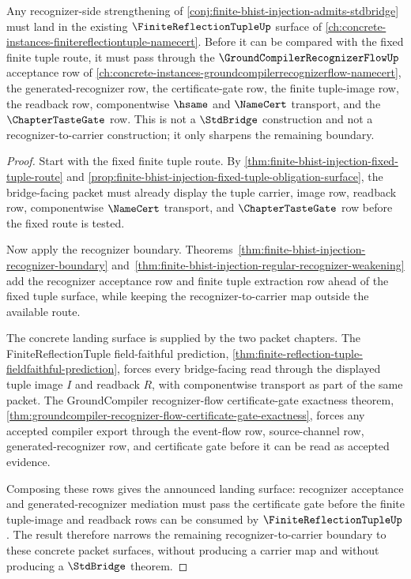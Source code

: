\begin{theorem}
\label{thm:finite-bhist-injection-recognizer-to-tuple-landing-surface}
Any recognizer-side strengthening of \autoref{conj:finite-bhist-injection-admits-stdbridge} must land in the existing $\FiniteReflectionTupleUp$ surface of \autoref{ch:concrete-instances-finitereflectiontuple-namecert}. Before it can be compared with the fixed finite tuple route, it must pass through the $\GroundCompilerRecognizerFlowUp$ acceptance row of \autoref{ch:concrete-instances-groundcompilerrecognizerflow-namecert}, the generated-recognizer row, the certificate-gate row, the finite tuple-image row, the readback row, componentwise $\hsame$ and $\NameCert$ transport, and the $\ChapterTasteGate$ row. This is not a $\StdBridge$ construction and not a recognizer-to-carrier construction; it only sharpens the remaining boundary.
\end{theorem}
\begin{proof}
Start with the fixed finite tuple route. By \autoref{thm:finite-bhist-injection-fixed-tuple-route} and \autoref{prop:finite-bhist-injection-fixed-tuple-obligation-surface}, the bridge-facing packet must already display the tuple carrier, image row, readback row, componentwise $\NameCert$ transport, and $\ChapterTasteGate$ row before the fixed route is tested.

Now apply the recognizer boundary. Theorems~\ref{thm:finite-bhist-injection-recognizer-boundary} and~\ref{thm:finite-bhist-injection-regular-recognizer-weakening} add the recognizer acceptance row and finite tuple extraction row ahead of the fixed tuple surface, while keeping the recognizer-to-carrier map outside the available route.

The concrete landing surface is supplied by the two packet chapters. The FiniteReflectionTuple field-faithful prediction, \autoref{thm:finite-reflection-tuple-fieldfaithful-prediction}, forces every bridge-facing read through the displayed tuple image $I$ and readback $R$, with componentwise transport as part of the same packet. The GroundCompiler recognizer-flow certificate-gate exactness theorem, \autoref{thm:groundcompiler-recognizer-flow-certificate-gate-exactness}, forces any accepted compiler export through the event-flow row, source-channel row, generated-recognizer row, and certificate gate before it can be read as accepted evidence.

Composing these rows gives the announced landing surface: recognizer acceptance and generated-recognizer mediation must pass the certificate gate before the finite tuple-image and readback rows can be consumed by $\FiniteReflectionTupleUp$. The result therefore narrows the remaining recognizer-to-carrier boundary to these concrete packet surfaces, without producing a carrier map and without producing a $\StdBridge$ theorem.
\end{proof}

